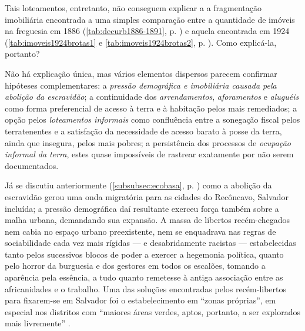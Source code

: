Tais loteamentos, entretanto, não conseguem explicar a a fragmentação imobiliária encontrada a uma simples comparação entre a quantidade de imóveis na freguesia em 1886 (\autoref{tab:decurb1886-1891}, p. \pageref{tab:decurb1886-1891}) e aquela encontrada em 1924 (\autoref{tab:imoveis1924brotas1} e \autoref{tab:imoveis1924brotas2}, p. \pageref{tab:imoveis1924brotas2}). Como explicá-la, portanto?

Não há explicação única, mas vários elementos dispersos parecem confirmar hipóteses complementares: a \textit{pressão demográfica e imobiliária causada pela abolição da escravidão}; a continuidade dos \textit{arrendamentos}, \textit{aforamentos} e \textit{aluguéis} como forma preferencial de acesso à terra e à habitação pelos mais remediados; a opção pelos \textit{loteamentos informais} como confluência entre a sonegação fiscal pelos terratenentes e a satisfação da necessidade de acesso barato à posse da terra, ainda que insegura, pelos mais pobres; a persistência dos processos de \textit{ocupação informal da terra}, estes quase impossíveis de rastrear exatamente por não serem documentados.

Já se discutiu anteriormente (\autoref{subsubsec:ecobasa}, p. \pageref{subsubsec:ecobasa}) como a abolição da escravidão gerou uma onda migratória para as cidades do Recôncavo, Salvador incluída; a pressão demográfica daí resultante exerceu força também sobre a malha urbana, demandando sua expansão. A massa de libertos recém-chegados nem cabia no espaço urbano preexistente, nem se enquadrava nas regras de sociabilidade cada vez mais rígidas --- e desabridamente racistas --- estabelecidas tanto pelos sucessivos blocos de poder a exercer a hegemonia política, quanto pelo horror da burguesia e dos gestores em todos os escalões, tomando a aparência pela essência, a tudo quanto remetesse à antiga associação entre as africanidades e o trabalho. Uma das soluções encontradas pelos recém-libertos para fixarem-se em Salvador foi o estabelecimento em ``zonas próprias'', em especial nos distritos com ``maiores áreas verdes, aptos, portanto, a ser explorados mais livremente'' \cite{santos_habitacao_1990}. 

